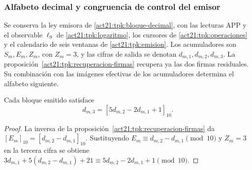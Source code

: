 \subsubsection{Alfabeto decimal y congruencia de control del emisor}
\label{sec:rec27-codigo}

Se conserva la ley emisora de \eqref{act21:tpk:bloque-decimal},
con las lecturas APP y el observable \(\ell_9\) de
\eqref{act21:tpk:logaritmo}, los cursores de
\ref{act21:tpk:operaciones} y el calendario de seis ventanas de
\ref{act21:tpk:emision}. Los acumuladores son \(S_m,E_m,Z_m\), con
\(Z_m=3\), y las cifras de salida se denotan \(d_{m,1},d_{m,2},d_{m,3}\).
La proposición~\ref{act21:tpk:recuperacion-firmas} recupera ya las dos
firmas residuales. Su combinación con las imágenes efectivas de los
acumuladores determina el alfabeto siguiente.

\begin{proposition}
Cada bloque emitido satisface
\[
 d_{m,3}=[5d_{m,2}-2d_{m,1}+1]_{10}.
\]
\end{proposition}
\begin{proof}
La inversa de la proposición~\ref{act21:tpk:recuperacion-firmas}
da \([E_m]_{10}=[d_{m,2}-d_{m,1}]_{10}\). Sustituyendo
$E_m\equiv d_{m,2}-d_{m,1}\pmod{10}$ y $Z_m=3$ en la tercera cifra se obtiene
$3d_{m,1}+5(d_{m,2}-d_{m,1})+21\equiv5d_{m,2}-2d_{m,1}+1\pmod{10}$.
\end{proof}

